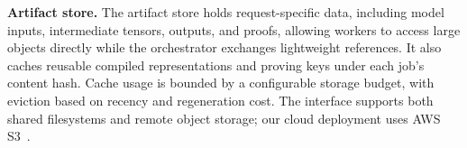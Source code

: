 \noindent\textbf{Artifact store.}
The artifact store holds request-specific data, including model inputs, intermediate tensors, outputs, and proofs, allowing workers to access large objects directly while the orchestrator exchanges lightweight references. It also caches reusable compiled representations and proving keys under each job's content hash. Cache usage is bounded by a configurable storage budget, with eviction based on recency and regeneration cost. The interface supports both shared filesystems and remote object storage; our cloud deployment uses AWS S3~\cite{aws-s3}.








